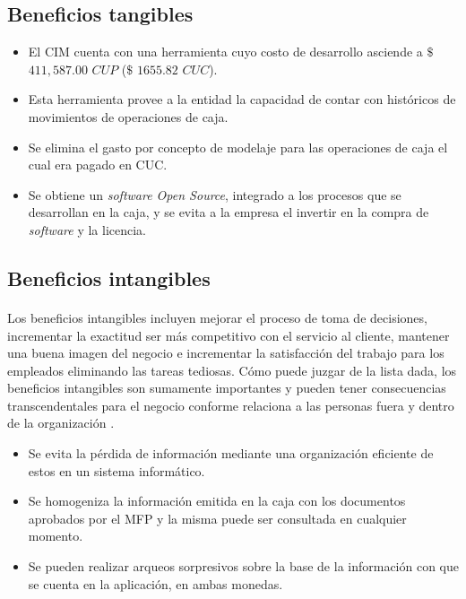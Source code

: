 \subsection{Beneficios tangibles}
\begin{itemize}
	\item El CIM cuenta con una herramienta cuyo costo de desarrollo asciende a $\$$ $411,587.00$ $CUP$ ($\$$ $1655.82$ $CUC$).
	\item Esta herramienta provee a la entidad la capacidad de contar con históricos de movimientos de operaciones de caja.
	\item Se elimina el gasto por concepto de modelaje para las operaciones de caja el cual era pagado en CUC.
	\item Se obtiene un \textit{software Open Source}, integrado a los procesos que se desarrollan en la caja, y se evita a la empresa el invertir en la compra de \textit{software} y la licencia.
\end{itemize}

\subsection{Beneficios intangibles}
\paragraph{}Los beneficios intangibles incluyen mejorar el proceso de toma de decisiones, incrementar la exactitud ser más competitivo con el servicio al cliente, mantener una buena imagen del negocio e incrementar la satisfacción del trabajo para los empleados eliminando las tareas tediosas. Cómo puede juzgar de la lista dada, los beneficios intangibles son sumamente importantes y pueden tener consecuencias transcendentales para el negocio conforme relaciona a las personas fuera y dentro de la organización \cite{clavo_beneficios_2013}.
\begin{itemize}
	\item Se evita la pérdida de información mediante una organización eficiente de estos en un sistema informático.
	\item Se homogeniza la información emitida en la caja con los documentos aprobados por el MFP y la misma puede ser consultada en cualquier momento.
	\item Se pueden realizar arqueos sorpresivos sobre la base de la información con que se cuenta en la aplicación, en ambas monedas.
\end{itemize}

